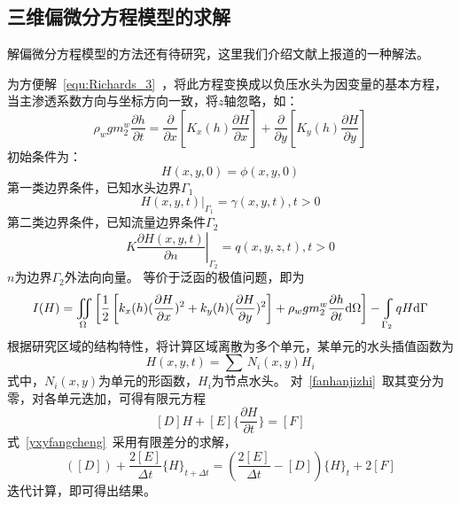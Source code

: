 \documentclass[a4paper,cs4size,adobefonts,fancyhdr]{ctexart}[2005/11/25]
\newcommand{\upcite}[1]{\textsuperscript{\textsuperscript{\cite{#1}}}}
\numberwithin{equation}{section} %
\newcommand{\dif}{\mathrm{d}}
\begin{document}
\subsection{三维偏微分方程模型的求解}
解偏微分方程模型的方法还有待研究，这里我们介绍文献上报道的一种解法\upcite{李焕荣2007}。\par
为方便解~\ref{equ:Richards_3}~，将此方程变换成以负压水头为因变量的基本方程，当主渗透系数方向与坐标方向一致，将$z$轴忽略，如：
\begin{equation}
\rho_w gm_2^w\dfrac{\partial h}{\partial t}
=\dfrac{\partial}{\partial x}\left[K_x(h)\dfrac{\partial H}{\partial x}\right]+
\dfrac{\partial}{\partial y}\left[K_y(h)\dfrac{\partial H}{\partial y}\right]
\end{equation}
初始条件为：
\begin{equation}
H(x,y,0)=\phi(x,y,0)
\end{equation}
第一类边界条件，已知水头边界$\Gamma_1$
\begin{equation}
\left.H(x,y,t)\right|_{\Gamma_1}=\gamma(x,y,t),t>0
\end{equation}
第二类边界条件，已知流量边界条件$\Gamma_2$
\begin{equation}
\left.K\dfrac{\partial H(x,y,t)}{\partial n}\right|_{\Gamma_2}=q(x,y,z,t),t>0
\end{equation}
$n$为边界$\Gamma_2$外法向向量\upcite{高雷阜2011}。
等价于泛函的极值问题，即为
\begin{equation}\label{fanhanjizhi}
I(H)=\iint\limits_\Omega\left[\dfrac{1}{2}\left[k_x(h)(\dfrac{\partial H}{\partial x})^2+k_y(h)(\dfrac{\partial H}{\partial y})^2\right]+\rho_w gm_2^w\dfrac{\partial h}{\partial t}\dif \Omega\right] - \varint\limits_{\Gamma_2}qH\dif \Gamma
\end{equation}
根据研究区域的结构特性，将计算区域离散为多个单元，某单元的水头插值函数为
\begin{equation}
H(x,y,t)=\sum\,N_i(x,y)H_i
\end{equation}
式中，$N_i(x,y)$为单元的形函数，$H_i$为节点水头。
对~\ref{fanhanjizhi}~取其变分为零，对各单元迭加，可得有限元方程
\begin{equation}\label{yxyfangcheng}
[D]{H}+[E]\{\dfrac{\partial H}{\partial t}\}=[F]
\end{equation}
式~\ref{yxyfangcheng}~采用有限差分的求解，
\begin{equation}
([D])+\dfrac{2[E]}{\Delta t}\{H\}_{t+\Delta t}=(\dfrac{2[E]}{\Delta t}-[D])\{H\}_t+2[F]
\end{equation}
迭代计算，即可得出结果。
\end{document}
